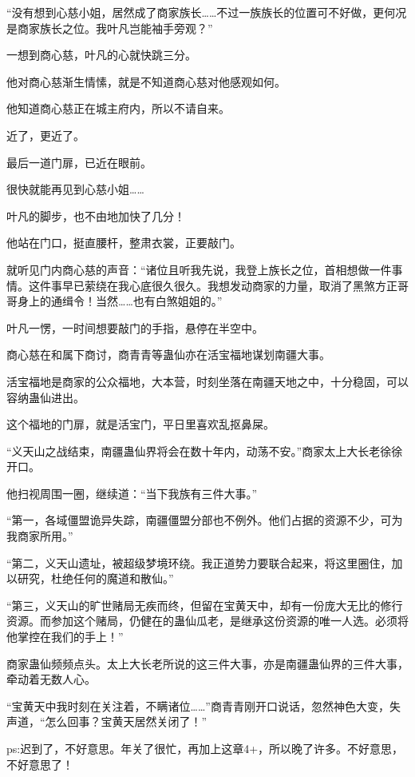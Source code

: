 \begin{this_body}
“没有想到心慈小姐，居然成了商家族长……不过一族族长的位置可不好做，更何况是商家族长之位。我叶凡岂能袖手旁观？”

一想到商心慈，叶凡的心就快跳三分。

他对商心慈渐生情愫，就是不知道商心慈对他感观如何。

他知道商心慈正在城主府内，所以不请自来。

近了，更近了。

最后一道门扉，已近在眼前。

很快就能再见到心慈小姐……

叶凡的脚步，也不由地加快了几分！

他站在门口，挺直腰杆，整肃衣裳，正要敲门。

就听见门内商心慈的声音：“诸位且听我先说，我登上族长之位，首相想做一件事情。这件事早已萦绕在我心底很久很久。我想发动商家的力量，取消了黑煞方正哥哥身上的通缉令！当然……也有白煞姐姐的。”

叶凡一愣，一时间想要敲门的手指，悬停在半空中。

商心慈在和属下商讨，商青青等蛊仙亦在活宝福地谋划南疆大事。

活宝福地是商家的公众福地，大本营，时刻坐落在南疆天地之中，十分稳固，可以容纳蛊仙进出。

这个福地的门扉，就是活宝门，平日里喜欢乱抠鼻屎。

“义天山之战结束，南疆蛊仙界将会在数十年内，动荡不安。”商家太上大长老徐徐开口。

他扫视周围一圈，继续道：“当下我族有三件大事。”

“第一，各域僵盟诡异失踪，南疆僵盟分部也不例外。他们占据的资源不少，可为我商家所用。”

“第二，义天山遗址，被超级梦境环绕。我正道势力要联合起来，将这里圈住，加以研究，杜绝任何的魔道和散仙。”

“第三，义天山的旷世赌局无疾而终，但留在宝黄天中，却有一份庞大无比的修行资源。而参加这个赌局，仍健在的蛊仙瓜老，是继承这份资源的唯一人选。必须将他掌控在我们的手上！”

商家蛊仙频频点头。太上大长老所说的这三件大事，亦是南疆蛊仙界的三件大事，牵动着无数人心。

“宝黄天中我时刻在关注着，不瞒诸位……”商青青刚开口说话，忽然神色大变，失声道，“怎么回事？宝黄天居然关闭了！”

ps:迟到了，不好意思。年关了很忙，再加上这章4+，所以晚了许多。不好意思，不好意思了！

\end{this_body}

